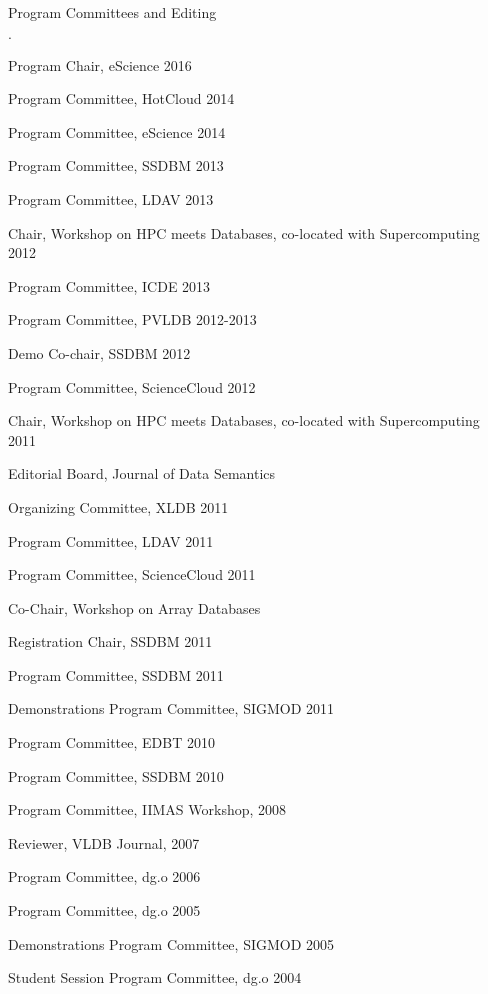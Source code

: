 \documentclass[10pt]{article}
\newenvironment{bulletlist}
   {
      \begin{list}
         {$\cdot$}
         {
            \setlength{\itemsep}{.5ex}
            \setlength{\parsep}{0ex}
            \setlength{\leftmargin}{0.7em}
            \setlength{\parskip}{0ex}
            \setlength{\topsep}{0ex}
         }
   }
   {
      \end{list}
   }
\newcommand{\marginlabel}[1]{
\begin{minipage}[b]{0.8\labelwidth}{\large \textsf{\textbf{#1}}}\end{minipage}}
\newcommand{\entrylabel}[1]{\mbox{\marginlabel{#1}}\hfill}
\newcommand{\MainListlabel}[1]
   {
      \parbox[t]{\labelwidth}{\hspace{.8em}\marginlabel{#1}}
   }
\newenvironment{MainList}[1]
   {
      \renewcommand{\entrylabel}{\MainListlabel}
      \begin{list}{}
      {
         \renewcommand{\makelabel}{\entrylabel}
         \setlength   {\itemindent}{-.65em}
         \setlength   {\labelwidth}{#1}
         \setlength   {\leftmargin}{\labelwidth}
         \setlength   {\itemsep}{3ex}
      }
   }
   {
      \end{list}
   }
\begin{document}
\begin{MainList}{88pt}
\item [Program Committees and Editing]
\begin{bulletlist}
\item Program Chair, eScience 2016
\item Program Committee, HotCloud 2014
\item Program Committee, eScience 2014
\item Program Committee, SSDBM 2013
\item Program Committee, LDAV 2013
\item Chair, Workshop on HPC meets Databases, co-located with Supercomputing 2012
\item Program Committee, ICDE 2013
\item Program Committee, PVLDB 2012-2013
\item Demo Co-chair, SSDBM 2012
\item Program Committee, ScienceCloud 2012
\item Chair, Workshop on HPC meets Databases, co-located with Supercomputing 2011
\item Editorial Board, Journal of Data Semantics
\item Organizing Committee, XLDB 2011
\item Program Committee, LDAV 2011
\item Program Committee, ScienceCloud 2011
\item Co-Chair, Workshop on Array Databases
\item Registration Chair, SSDBM 2011
\item Program Committee, SSDBM 2011
\item Demonstrations Program Committee, SIGMOD 2011
\item Program Committee, EDBT 2010
\item Program Committee, SSDBM 2010
\item Program Committee, IIMAS Workshop, 2008
\item Reviewer, VLDB Journal, 2007
\item Program Committee, dg.o 2006
\item Program Committee, dg.o 2005
\item Demonstrations Program Committee, SIGMOD 2005
\item Student Session Program Committee, dg.o 2004
\end{bulletlist}



\end{MainList}
\end{document}
